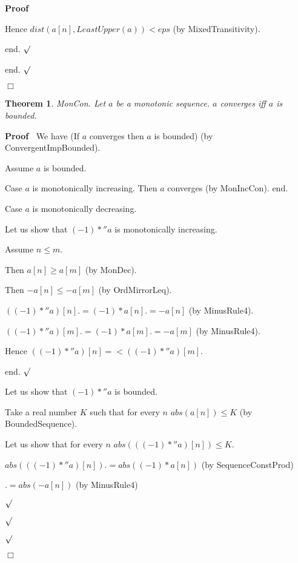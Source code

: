 \documentclass{article}
\newenvironment{forthel}{\begin{leftbar}}{\end{leftbar}}
\newenvironment{proof}{\noindent\textbf{Proof\ }}{\hspace*{\fill}$\Box$\medskip}
\newenvironment{subproof}{\begin{list}{}{}
		\item[\text{Proof}]}{\hfill $\surd$ \end{list}}
\newtheorem{theorem}{Theorem}
\begin{document}
\begin{forthel}
\begin{proof}
\begin{subproof}
\begin{subproof}
				Hence $dist(a[n],LeastUpper(a)) < eps$ (by MixedTransitivity).
				
				end.
			\end{subproof}
			
			end.
		\end{subproof}
	\end{proof}
	
	\begin{theorem}
		MonCon.
		Let $a$ be a monotonic sequence. $a$ converges iff $a$ is bounded.
	\end{theorem}
	
	\begin{proof}
		We have (If $a$ converges then $a$ is bounded) (by ConvergentImpBounded).
		
		Assume $a$ is bounded.
		
		Case $a$ is monotonically increasing. Then $a$ converges (by MonIncCon). 
		end.
		
		Case $a$ is monotonically decreasing.
		
		\begin{subproof}
			Let us show that $(-1) *'' a$ is monotonically increasing.
			
			\begin{subproof}
				Assume $n \leq m$.
				
				Then $a[n] \geq a[m]$ (by MonDec).
				
				Then $-a[n] \leq -a[m]$ (by OrdMirrorLeq).
				
				$((-1) *'' a)[n] .= (-1) * a[n]
				.= -a[n]$ (by MinusRule4).
				
				$((-1) *'' a)[m] .= (-1) * a[m]
				.= -a[m]$ (by MinusRule4).
				
				Hence $((-1) *'' a)[n] =< ((-1) *'' a)[m]$.
				
				end.
			\end{subproof}
			
			Let us show that $(-1) *'' a$ is bounded.
			
			\begin{subproof}
				Take a real number $K$ such that for every $n$ $abs(a[n]) \leq K$ (by BoundedSequence).
				
				Let us show that for every $n$ $abs(((-1) *'' a)[n]) \leq K$.
				
				\begin{subproof}
					$abs(((-1) *'' a)[n]) .= abs((-1) * a[n])$ (by SequenceConstProd)
					
					$.= abs(-a[n])$ (by MinusRule4)
					

\end{subproof}
\end{subproof}
\end{subproof}
\end{proof}
\end{forthel}
\end{document}
